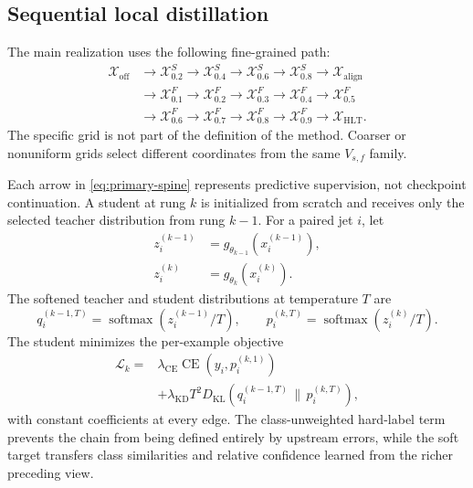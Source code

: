 \documentclass[11pt]{article}
\newcommand{\xoff}{\mathcal{X}_{\mathrm{off}}}
\newcommand{\xalign}{\mathcal{X}_{\mathrm{align}}}
\newcommand{\xhlt}{\mathcal{X}_{\mathrm{HLT}}}
\newcommand{\xsupp}[1]{\mathcal{X}^{S}_{#1}}
\newcommand{\xfield}[1]{\mathcal{X}^{F}_{#1}}
\begin{document}
\subsection{Sequential local distillation}

The main realization uses the following fine-grained path:
\begin{equation}
\begin{split}
    \xoff
      &\rightarrow \xsupp{0.2}\rightarrow \xsupp{0.4}
       \rightarrow \xsupp{0.6}\rightarrow \xsupp{0.8}
       \rightarrow \xalign\\
      &\rightarrow \xfield{0.1}\rightarrow \xfield{0.2}
       \rightarrow \xfield{0.3}\rightarrow \xfield{0.4}
       \rightarrow \xfield{0.5}\\
      &\rightarrow \xfield{0.6}\rightarrow \xfield{0.7}
       \rightarrow \xfield{0.8}\rightarrow \xfield{0.9}
       \rightarrow \xhlt.
    \label{eq:primary-spine}
\end{split}
\end{equation}
The specific grid is not part of the definition of the method.  Coarser or
nonuniform grids select different coordinates from the same $V_{s,f}$ family.

Each arrow in \cref{eq:primary-spine} represents predictive supervision, not
checkpoint continuation.  A student at rung $k$ is initialized from scratch
and receives only the selected teacher distribution from rung $k-1$.  For a
paired jet $i$, let
\begin{align}
    z_i^{(k-1)} &= g_{\theta_{k-1}}(x_i^{(k-1)}),\\
    z_i^{(k)}   &= g_{\theta_k}(x_i^{(k)}).
\end{align}
The softened teacher and student distributions at temperature $T$ are
\begin{equation}
    q_i^{(k-1,T)}=\operatorname{softmax}\!\left(z_i^{(k-1)}/T\right),
    \qquad
    p_i^{(k,T)}=\operatorname{softmax}\!\left(z_i^{(k)}/T\right).
\end{equation}
The student minimizes the per-example objective
\begin{equation}
\begin{split}
    \mathcal{L}_k
      ={}& \lambda_{\mathrm{CE}}
          \operatorname{CE}\!\left(y_i,p_i^{(k,1)}\right) \\
       &+\lambda_{\mathrm{KD}}T^2
          D_{\mathrm{KL}}\!\left(
            q_i^{(k-1,T)}\,\|\,p_i^{(k,T)}
          \right),
    \label{eq:ladder-loss}
\end{split}
\end{equation}
with constant coefficients at every edge.  The class-unweighted hard-label
term prevents the chain from being defined entirely by upstream errors, while
the soft target transfers class similarities and relative confidence learned
from the richer preceding view.
\end{document}
